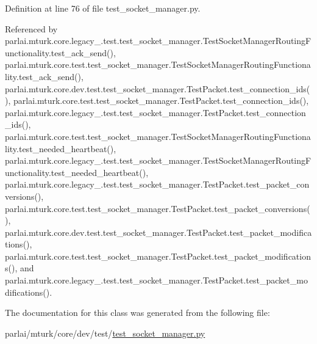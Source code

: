 Definition at line 76 of file test\+\_\+socket\+\_\+manager.\+py.



Referenced by parlai.\+mturk.\+core.\+legacy\+\_.\+test.\+test\+\_\+socket\+\_\+manager.\+Test\+Socket\+Manager\+Routing\+Functionality.\+test\+\_\+ack\+\_\+send(), parlai.\+mturk.\+core.\+test.\+test\+\_\+socket\+\_\+manager.\+Test\+Socket\+Manager\+Routing\+Functionality.\+test\+\_\+ack\+\_\+send(), parlai.\+mturk.\+core.\+dev.\+test.\+test\+\_\+socket\+\_\+manager.\+Test\+Packet.\+test\+\_\+connection\+\_\+ids(), parlai.\+mturk.\+core.\+test.\+test\+\_\+socket\+\_\+manager.\+Test\+Packet.\+test\+\_\+connection\+\_\+ids(), parlai.\+mturk.\+core.\+legacy\+\_.\+test.\+test\+\_\+socket\+\_\+manager.\+Test\+Packet.\+test\+\_\+connection\+\_\+ids(), parlai.\+mturk.\+core.\+test.\+test\+\_\+socket\+\_\+manager.\+Test\+Socket\+Manager\+Routing\+Functionality.\+test\+\_\+needed\+\_\+heartbeat(), parlai.\+mturk.\+core.\+legacy\+\_.\+test.\+test\+\_\+socket\+\_\+manager.\+Test\+Socket\+Manager\+Routing\+Functionality.\+test\+\_\+needed\+\_\+heartbeat(), parlai.\+mturk.\+core.\+legacy\+\_.\+test.\+test\+\_\+socket\+\_\+manager.\+Test\+Packet.\+test\+\_\+packet\+\_\+conversions(), parlai.\+mturk.\+core.\+test.\+test\+\_\+socket\+\_\+manager.\+Test\+Packet.\+test\+\_\+packet\+\_\+conversions(), parlai.\+mturk.\+core.\+dev.\+test.\+test\+\_\+socket\+\_\+manager.\+Test\+Packet.\+test\+\_\+packet\+\_\+modifications(), parlai.\+mturk.\+core.\+test.\+test\+\_\+socket\+\_\+manager.\+Test\+Packet.\+test\+\_\+packet\+\_\+modifications(), and parlai.\+mturk.\+core.\+legacy\+\_.\+test.\+test\+\_\+socket\+\_\+manager.\+Test\+Packet.\+test\+\_\+packet\+\_\+modifications().



The documentation for this class was generated from the following file\+:\begin{DoxyCompactItemize}
\item 
parlai/mturk/core/dev/test/\hyperlink{dev_2test_2test__socket__manager_8py}{test\+\_\+socket\+\_\+manager.\+py}\end{DoxyCompactItemize}
